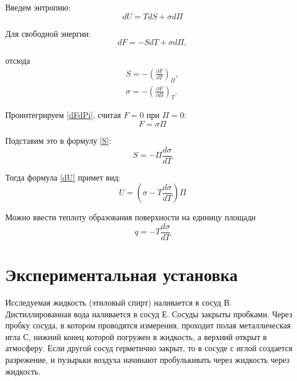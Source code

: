 \documentclass[12pt]{article}
\begin{document}
    Введем энтропию:
    \begin{equation}
        dU = TdS + \sigma d\Pi
        \label{dU}
    \end{equation}
    
    Для свободной энергии:
    \begin{equation}
        dF = -SdT + \sigma d\Pi,
    \end{equation}

    отсюда 
    \begin{eqnarray}
        S = -\left(\frac{\partial F}{\partial T}\right)_{\Pi}, \label{S}\\
        \sigma = -\left(\frac{\partial F}{\partial \Pi}\right)_T.
        \label{dFdPi}
    \end{eqnarray}

    Проинтегрируем \ref{dFdPi}, считая $F = 0$ при $\Pi = 0$:
    \begin{equation}
        F = \sigma \Pi
    \end{equation}

    Подставим это в формулу \ref{S}:
    \begin{equation}
        S = -\Pi \frac{d\sigma}{dT}
    \end{equation}

    Тогда формула \ref{dU} примет вид:
    \begin{equation}
        U = \left(\sigma - T\frac{d\sigma}{dT}\right)\Pi
        \label{U}
    \end{equation}

    Можно ввести теплоту образования поверхности на единицу площади
    \begin{equation}
        q = -T\frac{d\sigma}{dT}
        \label{q}
    \end{equation}

    \section{Экспериментальная установка}
    Исследуемая жидкость (этиловый спирт) наливается в сосуд В.
    Дистиллированная вода наливается в сосуд Е. Сосуды закрыты пробками. Через
    пробку сосуда, в котором проводятся измерения, проходит полая металлическая игла
    С, нижний конец которой погружен в жидкость, а верхний открыт в атмосферу. Если
    другой сосуд герметично закрыт, то в сосуде с иглой создается разрежение,
    и пузырьки воздуха начинают пробулькивать через жидкость через жидкость.
    
\end{document}
